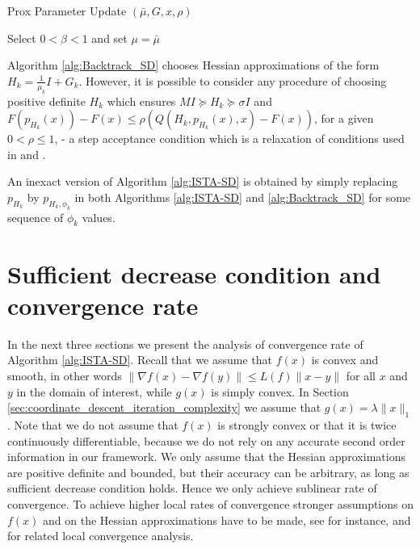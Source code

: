 \documentclass[11pt]{article}
\numberwithin{equation}{section}
\begin{document}
\begin{algorithm2e}\caption{Prox Parameter Update $(\bar \mu, G, x, \rho)$ }
    \label{alg:Backtrack_SD}%
Select $0<\beta<1$ and set $\mu=\bar \mu$\; 
\end{algorithm2e}




Algorithm \ref{alg:Backtrack_SD}  chooses Hessian approximations of the form $H_k=\frac{1}{\mu_k}I +G_k$. However, it is possible to consider any procedure of choosing positive definite $H_k$ which ensures $M I \succeq H_k\succeq \sigma I$ and 
$F(p_{H_k}(x))- F(x) \leq \rho (Q(H_k, p_{H_k}(x),x)- F(x))$, for a given $0<\rho\leq1$, - a step acceptance condition which is a relaxation of conditions used in  \cite{Beck2009} and \cite{Schmidtetal}.

An inexact version of Algorithm \ref{alg:ISTA-SD}  is obtained by simply replacing $p_{H_k}$ by $p_{H_k, \phi_k}$ in both Algorithms  \ref{alg:ISTA-SD} and \ref{alg:Backtrack_SD} for some sequence of $\phi_k$ values.  

\section{Sufficient decrease condition and convergence rate}
\label{sec:conv_exact}

In the next three sections we present the analysis of convergence rate of  Algorithm \ref{alg:ISTA-SD}. Recall that we assume that $f(x)$ is convex and smooth, in other words $\|\nabla f(x)-\nabla f(y)\|\leq L(f)\|x-y\|$ for all $x$ and $y$ in the domain of interest, while $g(x)$ is simply convex. In Section \ref{sec:coordinate_descent_iteration_complexity} we assume that $g(x)=\lambda \|x\|_1$. Note that we do not assume that $f(x)$ is strongly convex or that it is twice continuously differentiable, because we do not rely on any accurate second order information in our framework. We only assume that the Hessian approximations are positive definite and bounded, but their accuracy can be arbitrary, as long as sufficient decrease condition holds. Hence we only achieve sublinear rate of convergence. To achieve higher local rates of convergence stronger assumptions on $f(x)$ and on the Hessian approximations have to be made, see for instance, \cite{Byrdetal2013} and \cite{Saundersetal} for related local convergence analysis. 
\end{document}
